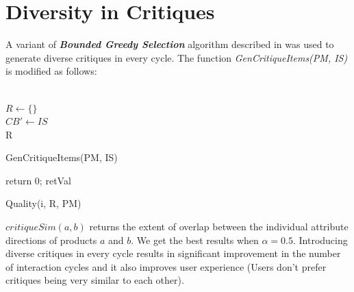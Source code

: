 \section{Diversity in Critiques}

A variant of \textit{\textbf{Bounded Greedy Selection}} algorithm described in \cite{boundedGreedy} was used to generate diverse critiques in every cycle.
The function \textit{GenCritiqueItems(PM, IS)} is modified as follows:\\
\\

\begin{algorithm}[ht]
  \DontPrintSemicolon

  $R \gets \{\}$\\
  $CB' \gets IS$\\
  \Return R
  \caption{GenCritiqueItems(PM, IS)}
  \label{algo:div}
\end{algorithm}

\begin{algorithm}[ht]
  \DontPrintSemicolon

   {return 0;}
  \Return retVal
  \caption{Quality(i, R, PM)}
  \label{algo:quality}
\end{algorithm}

$critiqueSim(a, b)$ returns the extent of overlap between the individual attribute directions of products $a$ and $b$.
We get the best results when $\alpha = 0.5$.
Introducing diverse critiques in every cycle results in significant improvement in the number of interaction cycles and it also improves user experience (Users don't prefer critiques being very similar to each other).


